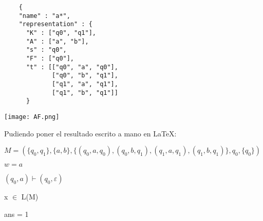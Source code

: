 \documentclass[12pt]{article}
\begin{document}
\begin{verbatim}
    {
    "name" : "a*",
    "representation" : {
      "K" : ["q0", "q1"],
      "A" : ["a", "b"],
      "s" : "q0",
      "F" : ["q0"],
      "t" : [["q0", "a", "q0"],
             ["q0", "b", "q1"],
             ["q1", "a", "q1"],
             ["q1", "b", "q1"]]
      }
\end{verbatim}

\vspace{5mm}
\texttt{[image: AF.png]}

\vspace{5mm}
Pudiendo poner el resultado escrito a mano en LaTeX:

$M = (\{q_0, q_1\}, \{a, b\}, \{(q_0, a, q_0), (q_0, b, q_1), (q_1, a, q_1), (q_1, b, q_1)\}, q_0, \{q_0\})$

$w = a$

$(q_0, a) \vdash (q_0, \varepsilon)$

x $\in$ L(M)

ans = 1
\end{document}
